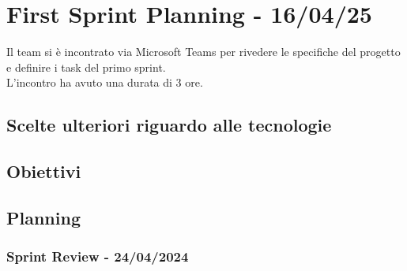 
\section{First Sprint Planning - 16/04/25}
Il team si è incontrato via Microsoft Teams per rivedere le specifiche del progetto e definire i task del primo sprint.\\
L'incontro ha avuto una durata di 3 ore.

\subsection{Scelte ulteriori riguardo alle tecnologie}

\subsection{Obiettivi}

\subsection{Planning}

\subsubsection{Sprint Review - 24/04/2024}
